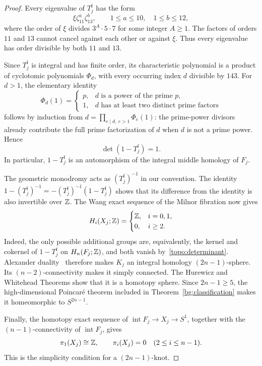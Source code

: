 \begin{proof}
Every eigenvalue of $T_j^{\mathrm f}$ has the form
\[
 \xi\zeta_{11}^{a}\zeta_{13}^{b},
 \qquad 1\leq a\leq10,\quad1\leq b\leq12,
\]
where the order of $\xi$ divides $3^A\cdot5\cdot7$ for some integer
$A\geq1$.  The factors of orders $11$ and $13$ cannot cancel against
each other or against $\xi$.  Thus every eigenvalue has order divisible
by both $11$ and $13$.

Since $T_j^{\mathrm f}$ is integral and has finite order, its
characteristic polynomial is a product of cyclotomic polynomials
$\Phi_d$, with every occurring index $d$ divisible by $143$.
For $d>1$, the elementary identity
\[
 \Phi_d(1)=
 \begin{cases}
 p,&d\text{ is a power of the prime }p,\\
 1,&d\text{ has at least two distinct prime factors}
 \end{cases}
\]
follows by induction from
$d=\prod_{e\mid d,\ e>1}\Phi_e(1)$: the prime-power divisors already
contribute the full prime factorization of $d$ when $d$ is not a
prime power.  Hence
\begin{equation}
\label{topo:determinant}
 \det(1-T_j^{\mathrm f})=1.
\end{equation}
In particular, $1-T_j^{\mathrm f}$ is an automorphism of the integral
middle homology of $F_j$.

The geometric monodromy acts as $(T_j^{\mathrm f})^{-1}$ in our
convention.  The identity
$1-(T_j^{\mathrm f})^{-1}=-(T_j^{\mathrm f})^{-1}(1-T_j^{\mathrm f})$
shows that its difference from the identity is also invertible over
$\mathbb Z$.  The Wang exact sequence of the Milnor fibration now gives
\[
 H_i(X_j;\mathbb Z)=
 \begin{cases}
 \mathbb Z,&i=0,1,\\
 0,&i\geq2.
 \end{cases}
\]
Indeed, the only possible additional groups are, equivalently, the
kernel and cokernel of $1-T_j^{\mathrm f}$ on $H_n(F_j;\mathbb Z)$, and both vanish
by~\eqref{topo:determinant}.  Alexander duality~\cite[Corollary~3.45]{Hatcher2002} therefore makes $K_j$
an integral homology $(2n-1)$-sphere.  Its $(n-2)$-connectivity makes
it simply connected.  The Hurewicz and Whitehead Theorems
\cite[Theorem~4.32 and Corollary~4.33]{Hatcher2002} show that
it is a homotopy sphere.  Since $2n-1\geq5$, the high-dimensional
Poincar\'e theorem included in Theorem~\ref{bg:classification}
makes it homeomorphic to $S^{2n-1}$.

Finally, the homotopy exact sequence of
$\operatorname{int}F_j\to X_j\to S^1$, together with the
$(n-1)$-connectivity of $\operatorname{int}F_j$, gives
\[
 \pi_1(X_j)\cong\mathbb Z,
 \qquad
 \pi_i(X_j)=0\quad(2\leq i\leq n-1).
\]
This is the simplicity condition for a $(2n-1)$-knot.
\end{proof}

